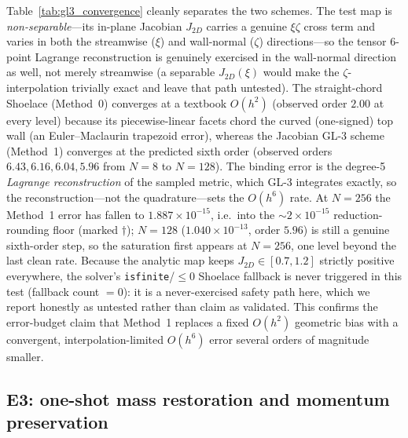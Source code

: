 \documentclass[11pt]{article}
\theoremstyle{definition}
\theoremstyle{remark}
\begin{document}
Table~\ref{tab:gl3_convergence} cleanly separates the two schemes. The test map is
\emph{non-separable}---its in-plane Jacobian $J_{2D}$ carries a genuine $\xi\zeta$
cross term and varies in both the streamwise ($\xi$) and wall-normal ($\zeta$)
directions---so the tensor $6$-point Lagrange reconstruction is genuinely exercised
in the wall-normal direction as well, not merely streamwise (a separable $J_{2D}(\xi)$
would make the $\zeta$-interpolation trivially exact and leave that path untested).
The straight-chord Shoelace (Method~0) converges at a textbook $O(h^2)$ (observed
order $2.00$ at every level) because its piecewise-linear facets chord the curved
(one-signed) top wall (an Euler--Maclaurin trapezoid error), whereas the Jacobian
GL-3 scheme (Method~1) converges at the predicted sixth order (observed orders
$6.43,6.16,6.04,5.96$ from $N{=}8$ to $N{=}128$). The binding error is the degree-5
\emph{Lagrange reconstruction} of the sampled metric, which GL-3 integrates exactly,
so the reconstruction---not the quadrature---sets the $O(h^6)$ rate. At $N{=}256$ the
Method~1 error has fallen to $1.887\times10^{-15}$, i.e.\ into the
$\sim\!2\times10^{-15}$ reduction-rounding floor (marked $\dagger$); $N{=}128$
($1.040\times10^{-13}$, order $5.96$) is still a genuine sixth-order step, so the
saturation first appears at $N{=}256$, one level beyond the last clean rate. Because
the analytic map keeps $J_{2D}\in[0.7,1.2]$ strictly positive everywhere, the
solver's \texttt{isfinite}/${\le}0$ Shoelace fallback is never triggered in this test
(fallback count $=0$): it is a never-exercised safety path here, which we report
honestly as untested rather than claim as validated. This confirms the error-budget
claim that Method~1 replaces a fixed $O(h^2)$ geometric bias with a convergent,
interpolation-limited $O(h^6)$ error several orders of magnitude smaller.

\subsection{E3: one-shot mass restoration and momentum preservation}
\end{document}
